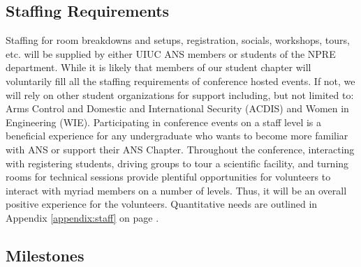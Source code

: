 \subsection{Staffing Requirements}
Staffing for room breakdowns and setups, registration, socials, workshops, 
tours, etc.  will be supplied by either UIUC ANS members or students of the 
NPRE department. While it is likely that members of our student chapter will 
voluntarily fill all the staffing requirements of conference hosted events. If 
not, we will rely on other student organizations for support including, but not 
limited to: Arms Control and Domestic and International Security (ACDIS) and 
Women in Engineering (WIE). Participating in conference events on a staff level 
is a beneficial experience for any undergraduate who wants to become more 
familiar with ANS or support their ANS Chapter. Throughout the conference, 
interacting with registering students, driving groups to tour a scientific 
facility, and turning rooms for technical sessions provide plentiful 
opportunities for volunteers to interact with myriad members on a number of 
levels. Thus, it will be an overall positive experience for the volunteers. 
Quantitative needs are outlined in Appendix \ref{appendix:staff} on page 
\pageref{appendix:staff}.

\newpage
\subsection{Milestones}

